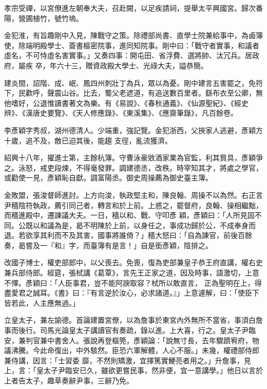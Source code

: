 \begin{pinyinscope}
 孝宗受禪，以宮僚進左朝奉大夫，召赴闕，以足疾請祠，提舉太平興國宮。歸次番陽，營圃植竹，號竹塢。



 金犯淮，有旨趣剛中入見，陳戰守之策。除禮部尚書、直學士院兼給事中，為鹵簿使，除端明殿學士、簽書樞密院事，進同知院事。剛中曰：「戰守者實事，和議者虛名，不可恃虛名害實事。」又奏四事：開屯田、省浮費、選將帥、汰冗兵。居政府，屬疾
 卒，年六十三，贈資政殿大學士、光祿大夫，謚恭簡。



 建炎間，詔階、成、岷、鳳四州刺壯丁為兵，眾以為憂。剛中建言五害罷之，免符下，民歡呼，聲震山谷。比去，蜀父老遮道，有追送數百里者。繇布衣至公卿，無他嗜好，公退惟讀書著文為樂。有《易說》、《春秋通義》、《仙源聖紀》、《經史辨》、《漢唐史要覽》、《天人修應錄》、《東溪集》、《應齋筆錄》，凡百餘卷。



 李彥穎字秀叔，湖州德清人。少端重，強記覽。金犯浙西，父挾家人逃避，彥穎方十歲，追不及，敵已迫其後，能趨
 支徑，亂流獲濟。



 紹興十八年，擢進士第，主餘杭簿。守曹泳豪敓酒家業為官監，利其貲具，彥穎爭之。泳怒，戒吏段煉，不得毫發罪。調建德丞，改秩。時宰知其才，將處之學官，或勸使一見，彥穎恥自獻。調富陽丞。御史周操薦為御史臺主簿。



 金敗盟，張浚督師進討。上方向浚，執政堅主和，陳良翰、周操不以為然。右正言尹穡陰符執政，薦引同己者，轉言和於上前。上惑之，罷督府，良翰、操相繼黜，而穡進殿中，遷諫議大夫。一日，穡以和、戰、守叩彥
 穎，彥穎曰：「人所見固不同。公既以和議為是，曷不明陳於上前，以身任之，事成功歸於公，不成奉身而退。若欲享其利而不及其害，國事將誰倚？」穡大怒曰：「自為諫官，前後百餘奏，曷嘗及一『和』字，而臺簿有是言！」自是銜彥穎，陰排之。



 改國子博士，權吏部郎中，以父喪去。免喪，復為吏部兼皇子恭王府直講，權右史兼兵部侍郎。經筵，張栻講《葛覃》，言先王正家之道，因及時事，語激切，上意不懌。彥穎曰：「人臣事君，豈不能阿諛取容？栻所以敢直言，
 正為聖明在上，得盡愛君之誠耳。《書》曰：『有言逆於汝心，必求諸道。』」上意遽解，曰：「使臣下皆若此，人主應無過。」



 立皇太子，兼左諭德。首論建置宮僚，以為詹事於東宮內外無所不當省，事須白詹事而後行。司馬光論皇太子講讀官有奏疏，錄以進。上大喜，行之。皇太子尹臨安，兼判官兼中書舍人。張說再登樞筦，彥穎論：「說無寸長，去年驟躋宥府，物議沸騰。今此命復出，中外駭然。臣恐六軍解體，人心不服。」未幾，權禮部侍郎兼侍講，因言：「士習委
 靡，不然則矯激，宜擇篤實鯁亮者用之。」升詹事，見上，言：「皇太子尹臨安已久，雖欲更嘗民事，然非便，宜一意講學。」他日以言於上者告太子，趣草奏辭尹事，三辭乃免。




\end{pinyinscope}
